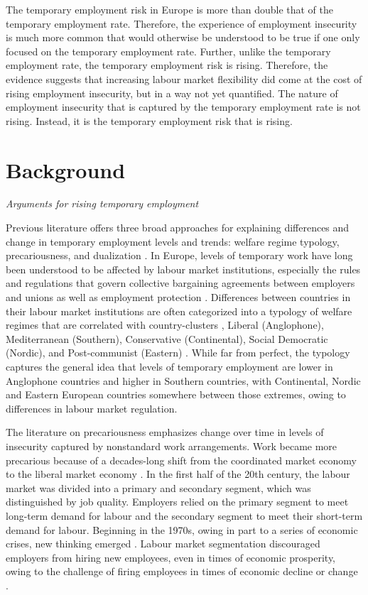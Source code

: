 \documentclass[12pt]{article}
\begin{document}
The temporary employment risk in Europe is more than double that of the temporary employment rate. Therefore, the experience of employment insecurity is much more common that would otherwise be understood to be true if one only focused on the temporary employment rate. Further, unlike the temporary employment rate, the temporary employment risk is rising. Therefore, the evidence suggests that increasing labour market flexibility did come at the cost of rising employment insecurity, but in a way not yet quantified. The nature of employment insecurity that is captured by the temporary employment rate is not rising. Instead, it is the temporary employment risk that is rising.

\section{Background}

\emph{Arguments for rising temporary employment}

Previous literature offers three broad approaches for explaining differences and change in temporary employment levels and trends: welfare regime typology, precariousness, and dualization \citep{hipp_etal_2015}.  In Europe, levels of temporary work have long been understood to be affected by labour market institutions, especially the rules and regulations that govern collective bargaining agreements between employers and unions as well as employment protection \citep{giesecke_gross_2004}.  Differences between countries in their labour market institutions are often categorized into a typology of welfare regimes that are correlated with country-clusters \citep{esping-anderson_regini_2000}, Liberal (Anglophone), Mediterranean (Southern), Conservative (Continental), Social Democratic (Nordic), and Post-communist (Eastern) \citep{van_lancker_2012}.  While far from perfect, the typology captures the general idea that levels of temporary employment are lower in Anglophone countries and higher in Southern countries, with Continental, Nordic and Eastern European countries somewhere between those extremes, owing to differences in labour market regulation.  

The literature on precariousness emphasizes change over time in levels of insecurity captured by nonstandard work arrangements.  Work became more precarious because of a decades-long shift from the coordinated market economy to the liberal market economy \citep{thelen_2014}.  In the first half of the 20th century, the labour market was divided into a primary and secondary segment, which was distinguished by job quality.  Employers relied on the primary segment to meet long-term demand for labour and the secondary segment to meet their short-term demand for labour.  Beginning in the 1970s, owing in part to a series of economic crises, new thinking emerged \citep{oecd_1986}.  Labour market segmentation discouraged employers from hiring new employees, even in times of economic prosperity, owing to the challenge of firing employees in times of economic decline or change \citep{lazear_1990}.  
\end{document}
